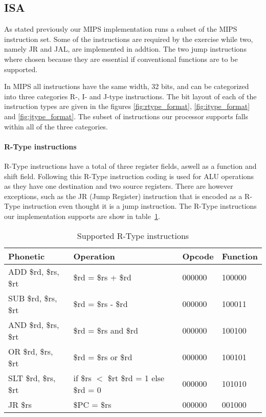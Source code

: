 \subsection{ISA}
\label{sec:isa}
As stated previously our MIPS implementation runs a subset of the MIPS instruction set. Some of the instructions are required by the exercise while two, namely JR and JAL, are implemented in addtion. The two jump instructions where chosen because they are essential if conventional functions are to be supported.

In MIPS all instructions have the same width, 32 bits, and can be categorized into three categories R-, I- and J-type instructions. The bit layout of each of the instruction types are given in the figures \ref{fig:rtype_format}, \ref{fig:itype_format} and \ref{fig:jtype_format}. The subset of instructions our processor supports falls within all of the three categories. 

\paragraph{R-Type instructions}

R-Type instructions have a total of three register fields, aswell as a function and shift field. Following this R-Type instruction coding is used for ALU operations as they have one destination and two source registers. There are however exceptions, such as the JR (Jump Register) instruction that is encoded as a R-Type instruction even thought it is a jump instruction. The R-Type instructions our implementation supports are show in table~\ref{table:rtype_instructions}.

\begin{table}[h]
    \begin{tabular}{l|l|l|l}
    Phonetic & Operation & Opcode & Function \\

    \hline
    ADD \$rd, \$rs, \$rt & \$rd = \$rs + \$rd   & 000000 & 100000 \\
    SUB \$rd, \$rs, \$rt & \$rd = \$rs - \$rd   & 000000 & 100011 \\ 
    AND \$rd, \$rs, \$rt & \$rd = \$rs and \$rd & 000000 & 100100 \\ 
    OR  \$rd, \$rs, \$rt & \$rd = \$rs or \$rd  & 000000 & 100101 \\  
    SLT \$rd, \$rs, \$rt & if \$rs $<$ \$rt \$rd = 1 else \$rd = 0  & 000000 & 101010 \\ 
    JR  \$rs             & \$PC = \$rs          & 000000 & 001000 \\ 
    \hline
    \end{tabular}

    \caption{Supported R-Type instructions}
    \label{table:rtype_instructions}
\end{table}

